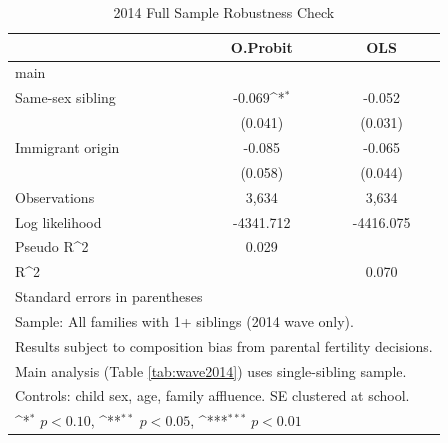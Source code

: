 \documentclass[12pt]{article}
\begin{document}
\begin{table}[htbp]\centering
\def\sym#1{\ifmmode^{#1}\else\(^{#1}\)\fi}
\caption{2014 Full Sample Robustness Check\label{tab:2014full}}
\begin{tabular}{l*{2}{c}}
\toprule
                &\multicolumn{1}{c}{O.Probit}&\multicolumn{1}{c}{OLS}\\
\midrule
main            &                  &                  \\
Same-sex sibling&   -0.069\sym{*}  &   -0.052         \\
                &  (0.041)         &  (0.031)         \\
Immigrant origin&   -0.085         &   -0.065         \\
                &  (0.058)         &  (0.044)         \\
\midrule
Observations    &    3,634         &    3,634         \\
Log likelihood  &-4341.712         &-4416.075         \\
Pseudo R^2      &    0.029         &                  \\
R^2             &                  &    0.070         \\
\bottomrule
\multicolumn{3}{l}{\footnotesize Standard errors in parentheses}\\
\multicolumn{3}{l}{\footnotesize Sample: All families with 1+ siblings (2014 wave only).}\\
\multicolumn{3}{l}{\footnotesize Results subject to composition bias from parental fertility decisions.}\\
\multicolumn{3}{l}{\footnotesize Main analysis (Table \ref{tab:wave2014}) uses single-sibling sample.}\\
\multicolumn{3}{l}{\footnotesize Controls: child sex, age, family affluence. SE clustered at school.}\\
\multicolumn{3}{l}{\footnotesize \sym{*} \(p<0.10\), \sym{**} \(p<0.05\), \sym{***} \(p<0.01\)}\\
\end{tabular}
\end{table}
\end{document}
